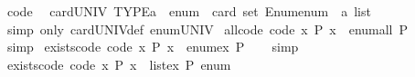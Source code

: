 \begin{isabellebody}
\ {\isacharbrackleft}{\kern0pt}code{\isacharbrackright}{\kern0pt}{\isacharcolon}{\kern0pt}\isanewline
\ \ {\isachardoublequoteopen}card{\isacharunderscore}{\kern0pt}UNIV\ TYPE{\isacharparenleft}{\kern0pt}{\isacharprime}{\kern0pt}a\ {\isacharcolon}{\kern0pt}{\isacharcolon}{\kern0pt}\ enum{\isacharparenright}{\kern0pt}\ {\isacharequal}{\kern0pt}\ card\ {\isacharparenleft}{\kern0pt}set\ {\isacharparenleft}{\kern0pt}Enum{\isachardot}{\kern0pt}enum\ {\isacharcolon}{\kern0pt}{\isacharcolon}{\kern0pt}\ {\isacharprime}{\kern0pt}a\ list{\isacharparenright}{\kern0pt}{\isacharparenright}{\kern0pt}{\isachardoublequoteclose}\isanewline
%
\isadelimproof
\ \ %
\endisadelimproof
%
\isatagproof
{}\isamarkupfalse%
\ {\isacharparenleft}{\kern0pt}simp\ only{\isacharcolon}{\kern0pt}\ card{\isacharunderscore}{\kern0pt}UNIV{\isacharunderscore}{\kern0pt}def\ enum{\isacharunderscore}{\kern0pt}UNIV{\isacharparenright}{\kern0pt}%
\endisatagproof
{\isafoldproof}%
%
\isadelimproof
\isanewline
%
\endisadelimproof
\isanewline
{}\isamarkupfalse%
\ all{\isacharunderscore}{\kern0pt}code\ {\isacharbrackleft}{\kern0pt}code{\isacharbrackright}{\kern0pt}{\isacharcolon}{\kern0pt}\ {\isachardoublequoteopen}{\isacharparenleft}{\kern0pt}{\isasymforall}x{\isachardot}{\kern0pt}\ P\ x{\isacharparenright}{\kern0pt}\ {\isasymlongleftrightarrow}\ enum{\isacharunderscore}{\kern0pt}all\ P{\isachardoublequoteclose}\isanewline
%
\isadelimproof
\ \ %
\endisadelimproof
%
\isatagproof
{}\isamarkupfalse%
\ simp%
\endisatagproof
{\isafoldproof}%
%
\isadelimproof
\isanewline
%
\endisadelimproof
\isanewline
{}\isamarkupfalse%
\ exists{\isacharunderscore}{\kern0pt}code\ {\isacharbrackleft}{\kern0pt}code{\isacharbrackright}{\kern0pt}{\isacharcolon}{\kern0pt}\ {\isachardoublequoteopen}{\isacharparenleft}{\kern0pt}{\isasymexists}x{\isachardot}{\kern0pt}\ P\ x{\isacharparenright}{\kern0pt}\ {\isasymlongleftrightarrow}\ enum{\isacharunderscore}{\kern0pt}ex\ P{\isachardoublequoteclose}\isanewline
%
\isadelimproof
\ \ %
\endisadelimproof
%
\isatagproof
{}\isamarkupfalse%
\ simp%
\endisatagproof
{\isafoldproof}%
%
\isadelimproof
\isanewline
%
\endisadelimproof
\isanewline
{}\isamarkupfalse%
\ exists{}{\isacharunderscore}{\kern0pt}code\ {\isacharbrackleft}{\kern0pt}code{\isacharbrackright}{\kern0pt}{\isacharcolon}{\kern0pt}\ {\isachardoublequoteopen}{\isacharparenleft}{\kern0pt}{\isasymexists}{\isacharbang}{\kern0pt}x{\isachardot}{\kern0pt}\ P\ x{\isacharparenright}{\kern0pt}\ {\isasymlongleftrightarrow}\ list{\isacharunderscore}{\kern0pt}ex{}\ P\ enum{\isachardoublequoteclose}\isanewline

\end{isabellebody}
